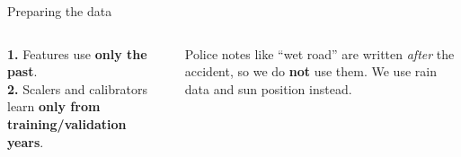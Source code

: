 \documentclass[aspectratio=169,11pt,t]{beamer}
\newcommand{\pname}{}
\newcommand{\ppart}{0}
\newcommand{\presenter}[3]{%
  \colorlet{pc}{#1}\renewcommand{\ppart}{#2}\renewcommand{\pname}{#3}}
\begin{document}
\presenter{p4}{4}{Helin Agze Gulec}

\begin{frame}{Preparing the data}
\vspace{-1mm}
\begin{columns}[T,onlytextwidth]
\resizebox{\linewidth}{!}{}
\begin{keybox}[title=Two golden rules]
\small
\textbf{1.} Features use \textbf{only the past}.\\[4pt]
\textbf{2.} Scalers and calibrators learn \textbf{only from training/validation years}.
\end{keybox}
\vspace{1mm}
\begin{softbox}\footnotesize
Police notes like ``wet road'' are written \emph{after} the accident, so we do \textbf{not} use them.
We use rain data and sun position instead.
\end{softbox}
\end{columns}
\end{frame}
\end{document}
